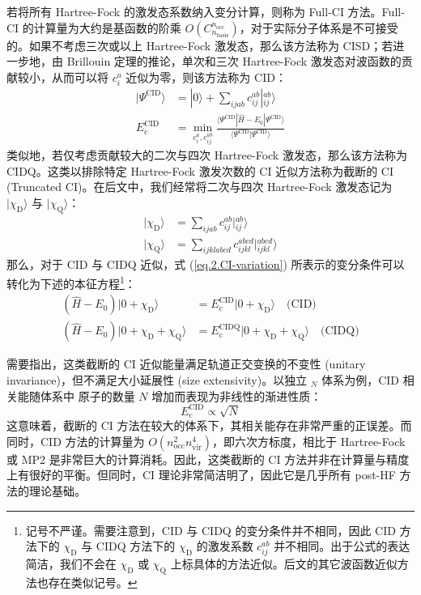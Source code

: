 若将所有 Hartree-Fock 的激发态系数纳入变分计算，则称为 Full-CI 方法。Full-CI 的计算量为大约是基函数的阶乘 $O(C_{n_\mathrm{basis}}^{n_\mathrm{occ}})$，对于实际分子体系是不可接受的。如果不考虑三次或以上 Hartree-Fock 激发态，那么该方法称为 CISD；若进一步地，由 Brillouin 定理的推论，单次和三次 Hartree-Fock 激发态对波函数的贡献较小，从而可以将 $c_i^a$ 近似为零，则该方法称为 CID：
\begin{align}
  | \Psi^\text{CID} \rangle &= | 0 \rangle + \sum_{ijab} c_{ij}^{ab} | {}_{ij}^{ab} \rangle \\
  E_\mathrm{c}^\mathrm{CID} &= \min_{c_i^a, c_{ij}^{ab}} \frac{\langle \Psi^\mathrm{CID} | \hat H - E_0 | \Psi^\mathrm{CID} \rangle}{\langle \Psi^\mathrm{CID} | \Psi^\mathrm{CID} \rangle}
\end{align}
类似地，若仅考虑贡献较大的二次与四次 Hartree-Fock 激发态，那么该方法称为 CIDQ。这类以排除特定 Hartree-Fock 激发次数的 CI 近似方法称为截断的 CI (Truncated CI)。在后文中，我们经常将二次与四次 Hartree-Fock 激发态记为 $| \chi_\mathrm{D} \rangle$ 与 $| \chi_\mathrm{Q} \rangle$：
\begin{align}
  \label{eq.2.ci-chi-d}
  | \chi_\mathrm{D} \rangle &= \sum_{ijab} c_{ij}^{ab} | {}_{ij}^{ab} \rangle \\
  \label{eq.2.ci-chi-q}
  | \chi_\mathrm{Q} \rangle &= \sum_{ijklabcd} c_{ijkl}^{abcd} | {}_{ijkl}^{abcd} \rangle
\end{align}
那么，对于 CID 与 CIDQ 近似，式 (\ref{eq.2.CI-variation}) 所表示的变分条件可以转化为下述的本征方程\footnote{记号不严谨。需要注意到，CID 与 CIDQ 的变分条件并不相同，因此 CID 方法下的 $\chi_\mathrm{D}$ 与 CIDQ 方法下的 $\chi_\mathrm{D}$ 的激发系数 $c_{ij}^{ab}$ 并不相同。出于公式的表达简洁，我们不会在 $\chi_\mathrm{D}$ 或 $\chi_\mathrm{Q}$ 上标具体的方法近似。后文的其它波函数近似方法也存在类似记号。}：
\begin{align}
  \label{eq.2.CID-eigen}
  (\hat H - E_0) | 0 + \chi_\mathrm{D} \rangle &= E_\mathrm{c}^\mathrm{CID} | 0 + \chi_\mathrm{D} \rangle \quad \text{(CID)} \\
  \label{eq.2.CIDQ-eigen}
  (\hat H - E_0) | 0 + \chi_\mathrm{D} + \chi_\mathrm{Q} \rangle &= E_\mathrm{c}^\mathrm{CIDQ} | 0 + \chi_\mathrm{D} + \chi_\mathrm{Q} \rangle \quad \text{(CIDQ)}
\end{align}

需要指出，这类截断的 CI 近似能量满足轨道正交变换的不变性 (unitary invariance)，但不满足大小延展性 (size extensivity)。以独立 $_{N}$ 体系为例，CID 相关能随体系中  原子的数量 $N$ 增加而表现为非线性的渐进性质\cite{Ahlrichs-Ahlrichs.CPC.1979, Szabo-Ostlund.Dover.1996}：
\begin{equation}
  E_\mathrm{c}^\mathrm{CID} \propto \sqrt{N}
\end{equation}
这意味着，截断的 CI 方法在较大的体系下，其相关能存在非常严重的正误差。而同时，CID 方法的计算量为 $O(n_\mathrm{occ}^2 n_\mathrm{vir}^4)$，即六次方标度，相比于 Hartree-Fock 或 MP2 是非常巨大的计算消耗。因此，这类截断的 CI 方法并非在计算量与精度上有很好的平衡。但同时，CI 理论非常简洁明了，因此它是几乎所有 post-HF 方法的理论基础。

